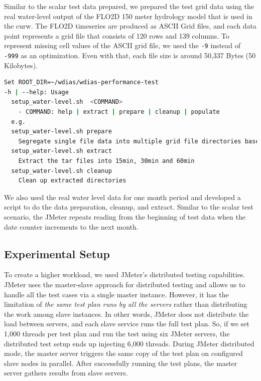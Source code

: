 Similar to the scalar test data prepared, we prepared the test grid data using the real water-level output of the FLO2D 150 meter hydrology model that is used in the \acrshort{curw}. The FLO2D timeseries are produced as ASCII Grid files, and each data point represents a grid file that consists of 120 rows and 139 columns. To represent missing cell values of the ASCII grid file, we used the \texttt{-9} instead of \texttt{-999} as an optimization. Even with that, each file size is around 50,337 Bytes (50 Kilobytes).

\begin{minipage}{\linewidth}
\begin{lstlisting}[language=sh, caption= Preparation of water-level data.]
Set ROOT_DIR=~/wdias/wdias-performance-test
-h | --help: Usage
  setup_water-level.sh  <COMMAND>
    - COMMAND: help | extract | prepare | cleanup | populate
  e.g.
  setup_water-level.sh prepare
    Segregate single file data into multiple grid file directories based on date. And Separate into main directories of 15min, 30min, 60min and create tar files
  setup_water-level.sh extract
    Extract the tar files into 15min, 30min and 60min
  setup_water-level.sh cleanup
    Clean up extracted directories
\end{lstlisting}
\end{minipage}

We also used the real water level data for one month period and developed a script to do the data preparation, cleanup, and extract. Similar to the scalar test scenario, the JMeter repeats reading from the beginning of test data when the date counter increments to the next month.


\subsection{Experimental Setup}
\label{subse:experimental_setup}

To create a higher workload, we used JMeter's distributed testing capabilities. JMeter uses the master-slave approach for distributed testing and allows us to handle all the test cases via a single master instance. However, it has the limitation of \emph{the same test plan runs by all the servers} rather than distributing the work among slave instances. In other words, JMeter does not distribute the load between servers, and each slave service runs the full test plan. So, if we set 1,000 threads per test plan and run the test using six JMeter servers, the distributed test setup ends up injecting 6,000 threads. During JMeter distributed mode, the master server triggers the same copy of the test plan on configured slave nodes in parallel. After successfully running the test plans, the master server gathers results from slave servers.

